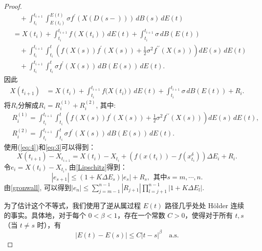 \begin{proof}
\begin{align*}
		&\quad + \int_{t_i}^{t_{i+1}} \int_{E(t_i)}^{E(t)}\sigma f^{\prime}(X(D(s-))) \, dB(s) \, dE(t)\\
		&= X(t_i) + \int_{t_i}^{t_{i+1}} f(X({t_i})) \, dE(t) + \int_{t_i}^{t_{i+1}} \sigma \, dB(E(t)) \\
		&\quad + \int_{t_i}^{t_{i+1}} \int_{t_i}^{t} \left( f(X(s)) f^{\prime}(X(s)) + \frac{1}{2} \sigma^2 f^{\prime\prime}(X(s)) \right) dE(s) \, dE(t) \\
		&\quad + \int_{t_i}^{t_{i+1}} \int_{t_i}^{t}\sigma f^{\prime}(X(s)) \, dB(E(s)) \, dE(t). 
	\end{align*}
	因此
	\begin{align}\label{eq:3}
		X(t_{i+1})
		&= X(t_i) + \int_{t_i}^{t_{i+1}} f(X({t_i)}) \, dE(t) + \int_{t_i}^{t_{i+1}} \sigma \, dB(E(t)) + R_i. 
	\end{align}
	将$R_i$分解成$R_i = R_i^{(1)} + R_i^{(2)}$, 其中:
	\begin{align*}
		& R_i^{(1)} = \int_{t_i}^{t_{i+1}} \int_{t_i}^{t} \left( f(X(s)) f^{\prime}(X(s)) + \frac{1}{2} \sigma^2 f^{\prime\prime}(X(s)) \right) dE(s) \, dE(t), \\
		& R_i^{(2)} = \int_{t_i}^{t_{i+1}} \int_{t_i}^{t} \sigma f^{\prime}(X(s)) \, dB(E(s)) \, dE(t). 
	\end{align*}
	使用(\ref{eq:4})和\eqref{eq:3}可以得到：
	\begin{equation}
		X({t_{i+1}})-X_{t_{i+1}}=X({t_i})-X_{t_i}+(f{(x({t_i}))}-f{(x^\delta_{t_i})})\Delta E_{i}+R_{i}. 
	\end{equation}
	令$e_i = X({t_i})-X_{t_i}$, 由\cref{Lipschitz}得到：
	\begin{equation}
		|e_{s+1}|\leq(1+K{\Delta}E_{s})|e_{s}|+R_{s}, ~~\text{其中}s=m,\cdots ,n.
	\end{equation}
	由\cref{gronwall}, 可以得到$|e_n| \leq \sum\limits_{j=m-1}^{n-1}|R_{j+1}|\prod\limits_{l=j+1}^{n-1}|1+K\Delta E_l|$. 
	
	为了估计这个不等式，我们使用了逆从属过程 \( E(t) \) 路径几乎处处 Hölder 连续的事实。具体地，对于每个 \( 0 < \beta < 1 \)，存在一个常数 \( C > 0 \)，使得对于所有 \( t, s \)（当 \( t \neq s \) 时），有
	\begin{equation}\label{Einc}
		|E(t) - E(s)| \leq C |t - s|^\beta \quad \text{a.s.}
	\end{equation}


\end{proof}
